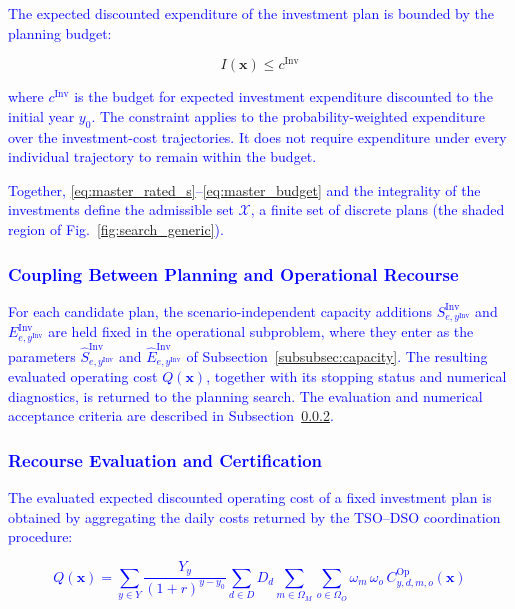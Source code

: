 \documentclass[preprint,12pt]{elsarticle}
\begin{document}
\textcolor{blue}{
    The expected discounted expenditure of the investment plan is bounded by the planning budget:
}

\begin{equation}
    I(\boldsymbol{x}) \leq c^{\text{Inv}}
    \label{eq:master_budget}
\end{equation}

\noindent
\textcolor{blue}{
    where 
    $c^{\text{Inv}}$ is the budget for expected investment expenditure discounted to the initial year $y_0$.
    The constraint applies to the probability-weighted expenditure over the investment-cost trajectories. It does not require expenditure under every individual trajectory to remain within the budget.
}

\textcolor{blue}{
    Together, \eqref{eq:master_rated_s}--\eqref{eq:master_budget} and the integrality of the investments define the admissible set $\mathcal{X}$, a finite set of discrete plans (the shaded region of Fig.~\ref{fig:search_generic}). 
}

\subsubsection{\textcolor{blue}{Coupling Between Planning and Operational Recourse}}

\textcolor{blue}{
    For each candidate plan, the scenario-independent capacity additions $S^{\text{Inv}}_{e,y^{\text{Inv}}}$ and $E^{\text{Inv}}_{e,y^{\text{Inv}}}$ are held fixed in the operational subproblem, where they enter as the parameters $\hat{S}^{\text{Inv}}_{e,y^{\text{Inv}}}$ and $\hat{E}^{\text{Inv}}_{e,y^{\text{Inv}}}$ of Subsection~\ref{subsubsec:capacity}. The resulting evaluated operating cost $Q(\boldsymbol{x})$, together with its stopping status and numerical diagnostics, is returned to the planning search. The evaluation and numerical acceptance criteria are described in Subsection~\ref{subsubsec:certification}.
}

\subsubsection{\textcolor{blue}{Recourse Evaluation and Certification}}
\label{subsubsec:certification}

\textcolor{blue}{
    The evaluated expected discounted operating cost of a fixed investment plan is obtained by aggregating the daily costs returned by the TSO--DSO coordination procedure:
}

\textcolor{blue}{
    \begin{equation}
        Q(\boldsymbol{x}) =
        \sum_{y \in Y} \frac{Y_y}{(1+r)^{y-y_0}}
        \sum_{d \in D} D_d
        \sum_{m \in \Omega_M} \sum_{o \in \Omega_O} \omega_m \, \omega_o \,
        C^{\text{Op}}_{y,d,m,o}(\boldsymbol{x})
        \label{eq:recourse_value}
    \end{equation}
}
\end{document}
